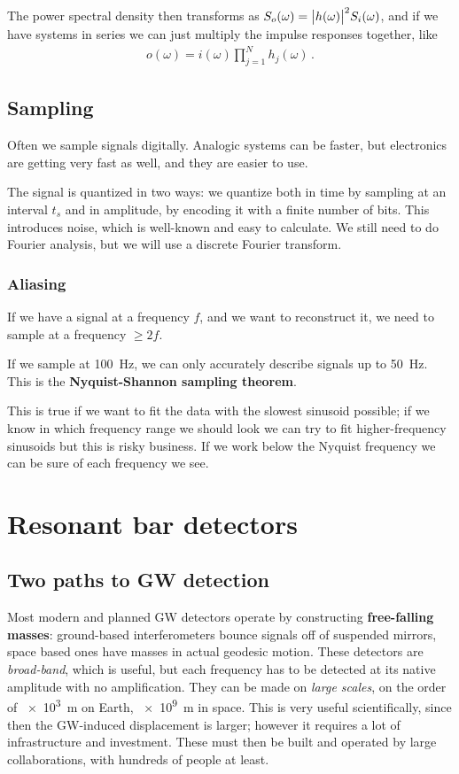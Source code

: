 \documentclass[main.tex]{subfiles}
\begin{document}
The power spectral density then transforms as \(S_o (\omega ) = \abs{h(\omega )}^2 S_i (\omega )\), and if we have systems in series we can just multiply the impulse responses together, like 
%
\begin{align}
o (\omega ) = i(\omega )\prod_{j = 1}^{N} h_j (\omega ) 
\,.
\end{align}

\subsection{Sampling}

Often we sample signals digitally.
Analogic systems can be faster, but electronics are getting very fast as well, and they are easier to use.

The signal is quantized in two ways: we quantize both in time by sampling at an interval \(t_s\) and in amplitude, by encoding it with a finite number of bits.
This introduces noise, which is well-known and easy to calculate.
We still need to do Fourier analysis, but we will use a discrete Fourier transform.

\subsubsection{Aliasing}

If we have a signal at a frequency \(f\), and we want to reconstruct it, we need to sample at a frequency \(\geq 2f\).

If we sample at \SI{100}{Hz}, we can only accurately describe signals up to \SI{50}{Hz}. 
This is the \textbf{Nyquist-Shannon sampling theorem}.

This is true if we want to fit the data with the slowest sinusoid possible; if we know in which frequency range we should look we can try to fit higher-frequency sinusoids but this is risky business.
If we work below the Nyquist frequency we can be sure of each frequency we see.

\section{Resonant bar detectors}

\subsection{Two paths to GW detection}

Most modern and planned GW detectors operate by constructing \textbf{free-falling masses}: ground-based interferometers bounce signals off of suspended mirrors, space based ones have masses in actual geodesic motion. 
These detectors are \emph{broad-band}, which is useful, but each frequency has to be detected at its native amplitude with no amplification. 
They can be made on \emph{large scales}, on the order of \SI{e3}{m} on Earth, \SI{e9}{m} in space. This is very useful scientifically, since then the GW-induced displacement is larger; however it requires a lot of infrastructure and investment. 
These must then be built and operated by large collaborations, with hundreds of people at least. 
\end{document}
